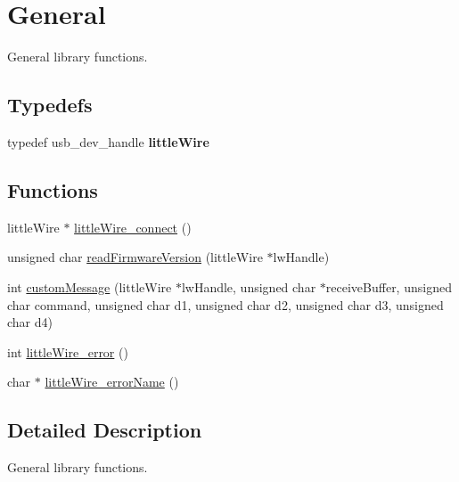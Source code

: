 \hypertarget{group__General}{\section{General}
\label{group__General}
}


General library functions.  


\subsection*{Typedefs}
\begin{DoxyCompactItemize}
\item 
\hypertarget{group__General_ga60ebdb67927ed8072efb1ecf6e7379c9}{typedef usb\-\_\-dev\-\_\-handle {\bfseries little\-Wire}}\label{group__General_ga60ebdb67927ed8072efb1ecf6e7379c9}

\end{DoxyCompactItemize}
\subsection*{Functions}
\begin{DoxyCompactItemize}
\item 
little\-Wire $\ast$ \hyperlink{group__General_gaba04ab4b25e585fbdcabffcb78545833}{little\-Wire\-\_\-connect} ()
\item 
unsigned char \hyperlink{group__General_gaafb8bda520f90f80ad865909a8150ff9}{read\-Firmware\-Version} (little\-Wire $\ast$lw\-Handle)
\item 
int \hyperlink{group__General_ga59ee076a1cfdaf48f3bc7a71dd66d143}{custom\-Message} (little\-Wire $\ast$lw\-Handle, unsigned char $\ast$receive\-Buffer, unsigned char command, unsigned char d1, unsigned char d2, unsigned char d3, unsigned char d4)
\item 
int \hyperlink{group__General_ga582d34d4f68dfd4a985abcb5a47d40bd}{little\-Wire\-\_\-error} ()
\item 
char $\ast$ \hyperlink{group__General_ga9608a04124f93a5c02576369698e64e9}{little\-Wire\-\_\-error\-Name} ()
\end{DoxyCompactItemize}


\subsection{Detailed Description}
General library functions. 

